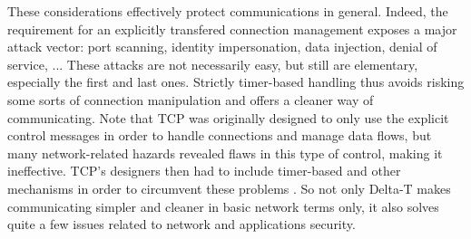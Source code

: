 \documentclass[a4paper]{proc}
\begin{document}
These considerations effectively protect communications in general. Indeed, the
requirement for an explicitly transfered connection management exposes a major
attack vector: port scanning, identity impersonation, data injection, denial of
service, ... These attacks are not necessarily easy, but still are elementary,
especially the first and last ones. Strictly timer-based handling thus avoids
risking some sorts of connection manipulation and offers a cleaner way of
communicating. Note that TCP was originally designed to only use the explicit
control messages in order to handle connections and manage data flows, but many
network-related hazards revealed flaws in this type of control, making it
ineffective. TCP's designers then had to include timer-based and other
mechanisms in order to circumvent these problems \cite{delta-t}. So not only
Delta-T makes communicating simpler and cleaner in basic network terms only, it
also solves quite a few issues related to network and applications security.


\nocite{*}
\newpage


\end{document}
